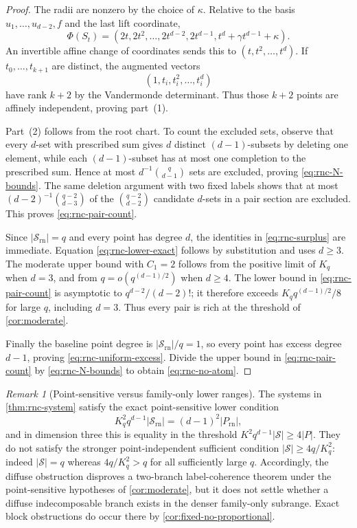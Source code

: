 \documentclass[11pt,letterpaper]{amsart}
\theoremstyle{definition}
\theoremstyle{remark}
\newtheorem{remark}[remark]{Remark}
\newcommand{\1}{\mathbf 1}
\begin{document}
\begin{proof}
The radii are nonzero by the choice of $\kappa$.  Relative to the basis $u_1,\ldots,u_{d-2},f$ and the last lift coordinate,
\[
 \Phi(S_t)=(2t,2t^2,\ldots,2t^{d-2},2t^{d-1},t^d+\gamma t^{d-1}+\kappa).
\]
An invertible affine change of coordinates sends this to $(t,t^2,\ldots,t^d)$.  If $t_0,\ldots,t_{k+1}$ are distinct, the augmented vectors
\[
 (1,t_i,t_i^2,\ldots,t_i^d)
\]
have rank $k+2$ by the Vandermonde determinant.  Thus those $k+2$ points are affinely independent, proving part~(1).

Part~(2) follows from the root chart.  To count the excluded sets, observe that every $d$-set with prescribed sum gives $d$ distinct $(d-1)$-subsets by deleting one element, while each $(d-1)$-subset has at most one completion to the prescribed sum.  Hence at most $d^{-1}\binom q{d-1}$ sets are excluded, proving \eqref{eq:rnc-N-bounds}.  The same deletion argument with two fixed labels shows that at most $(d-2)^{-1}\binom{q-2}{d-3}$ of the $\binom{q-2}{d-2}$ candidate $d$-sets in a pair section are excluded.  This proves \eqref{eq:rnc-pair-count}.

Since $|\mathcal S_{\mathrm{rn}}|=q$ and every point has degree $d$, the identities in \eqref{eq:rnc-surplus} are immediate.  Equation \eqref{eq:rnc-lower-exact} follows by substitution and uses $d\ge3$.  The moderate upper bound with $C_1=2$ follows from the positive limit of $K_q$ when $d=3$, and from $q=o(q^{(d-1)/2})$ when $d\ge4$.  The lower bound in \eqref{eq:rnc-pair-count} is asymptotic to $q^{d-2}/(d-2)!$; it therefore exceeds $K_qq^{(d-1)/2}/8$ for large $q$, including $d=3$.  Thus every pair is rich at the threshold of \cref{cor:moderate}.

Finally the baseline point degree is $|\mathcal S_{\mathrm{rn}}|/q=1$, so every point has excess degree $d-1$, proving \eqref{eq:rnc-uniform-excess}.  Divide the upper bound in \eqref{eq:rnc-pair-count} by \eqref{eq:rnc-N-bounds} to obtain \eqref{eq:rnc-no-atom}.
\end{proof}

\begin{remark}[Point-sensitive versus family-only lower ranges]\label{rem:rnc-lower-range}
The systems in \cref{thm:rnc-system} satisfy the exact point-sensitive lower condition
\[
 K_q^2q^{d-1}|\mathcal S_{\mathrm{rn}}|=(d-1)^2|P_{\mathrm{rn}}|,
\]
and in dimension three this is equality in the threshold $K^2q^{d-1}|\mathcal S|\ge4|P|$.  They do not satisfy the stronger point-independent sufficient condition $|\mathcal S|\ge4q/K_q^2$: indeed $|\mathcal S|=q$ whereas $4q/K_q^2>q$ for all sufficiently large $q$.  Accordingly, the diffuse obstruction disproves a two-branch label-coherence theorem under the point-sensitive hypotheses of \cref{cor:moderate}, but it does not settle whether a diffuse indecomposable branch exists in the denser family-only subrange.  Exact block obstructions do occur there by \cref{cor:fixed-no-proportional}.
\end{remark}
\end{document}
